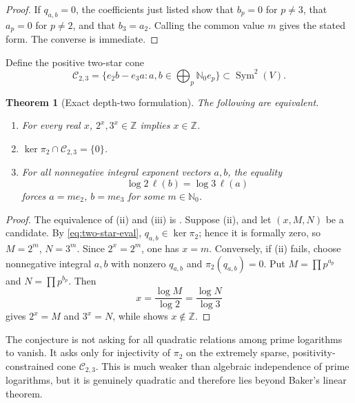 \documentclass[11pt]{article}
\newtheorem{theorem}{Theorem}[section]
\theoremstyle{definition}
\theoremstyle{remark}
\newcommand{\Z}{\mathbb{Z}}
\newcommand{\Nzero}{\mathbb{N}_{0}}
\newcommand{\Sym}{\operatorname{Sym}}
\newcommand{\ellmap}{\boldsymbol{\ell}}
\begin{document}
\begin{proof}
If $q_{a,b}=0$, the coefficients just listed show that $b_p=0$ for $p\ne3$, that
$a_p=0$ for $p\ne2$, and that $b_3=a_2$.  Calling the common value $m$ gives the stated
form.  The converse is immediate.
\end{proof}

Define the positive two-star cone
\begin{equation}
 \mathcal C_{2,3}
 =\{e_2b-e_3a:a,b\in\textstyle\bigoplus_p\Nzero e_p\}
 \subset\Sym^2(V).
 \label{eq:two-star-cone}
\end{equation}

\begin{theorem}[Exact depth-two formulation]
\label{thm:depth-two-equivalence}
The following are equivalent.
\begin{enumerate}[label=\textup{(\roman*)}]
\item For every real $x$, $2^x,3^x\in\Z$ implies $x\in\Z$.
\item $\ker\pi_2\cap\mathcal C_{2,3}=\{0\}$.
\item For all nonnegative integral exponent vectors $a,b$, the equality
\[
 \log2\,\ellmap(b)=\log3\,\ellmap(a)
\]
forces $a=me_2$, $b=me_3$ for some $m\in\Nzero$.
\end{enumerate}
\end{theorem}

\begin{proof}
The equivalence of (ii) and (iii) is .  Suppose (ii), and let
$(x,M,N)$ be a candidate.  By \eqref{eq:two-star-eval}, $q_{a,b}\in\ker\pi_2$; hence it is
formally zero, so $M=2^m$, $N=3^m$.  Since $2^x=2^m$, one has $x=m$.
Conversely, if (ii) fails, choose nonnegative integral $a,b$ with nonzero $q_{a,b}$ and
$\pi_2(q_{a,b})=0$.  Put $M=\prod p^{a_p}$ and $N=\prod p^{b_p}$.  Then
\[
 x=\frac{\log M}{\log2}=\frac{\log N}{\log3}
\]
gives $2^x=M$ and $3^x=N$, while  shows $x\notin\Z$.
\end{proof}

\begin{frontierbox}
The conjecture is not asking for all quadratic relations among prime logarithms to vanish.
It asks only for injectivity of $\pi_2$ on the extremely sparse, positivity-constrained cone
$\mathcal C_{2,3}$.  This is much weaker than algebraic independence of prime logarithms,
but it is genuinely quadratic and therefore lies beyond Baker's linear theorem.
\end{frontierbox}
\end{document}
